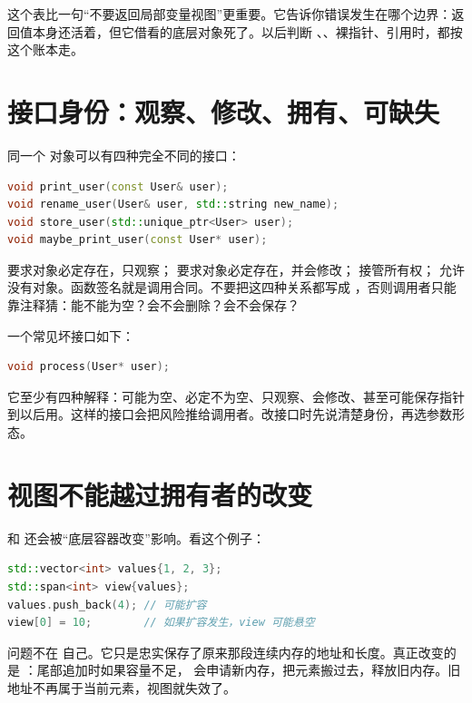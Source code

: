 这个表比一句“不要返回局部变量视图”更重要。它告诉你错误发生在哪个边界：返回值本身还活着，但它借看的底层对象死了。以后判断 、、裸指针、引用时，都按这个账本走。

\section{接口身份：观察、修改、拥有、可缺失}

同一个  对象可以有四种完全不同的接口：

\begin{lstlisting}[language=C++,caption={同一个对象的四种接口身份}]
void print_user(const User& user);
void rename_user(User& user, std::string new_name);
void store_user(std::unique_ptr<User> user);
void maybe_print_user(const User* user);
\end{lstlisting}

 要求对象必定存在，只观察； 要求对象必定存在，并会修改； 接管所有权； 允许没有对象。函数签名就是调用合同。不要把这四种关系都写成 ，否则调用者只能靠注释猜：能不能为空？会不会删除？会不会保存？

一个常见坏接口如下：

\begin{lstlisting}[language=C++,caption={含义不清的裸指针接口}]
void process(User* user);
\end{lstlisting}

它至少有四种解释：可能为空、必定不为空、只观察、会修改、甚至可能保存指针到以后用。这样的接口会把风险推给调用者。改接口时先说清楚身份，再选参数形态。

\section{视图不能越过拥有者的改变}

 和  还会被“底层容器改变”影响。看这个例子：

\begin{lstlisting}[language=C++,caption={vector 扩容后 span 可能失效}]
std::vector<int> values{1, 2, 3};
std::span<int> view{values};
values.push_back(4); // 可能扩容
view[0] = 10;        // 如果扩容发生，view 可能悬空
\end{lstlisting}

问题不在  自己。它只是忠实保存了原来那段连续内存的地址和长度。真正改变的是 ：尾部追加时如果容量不足， 会申请新内存，把元素搬过去，释放旧内存。旧地址不再属于当前元素，视图就失效了。

